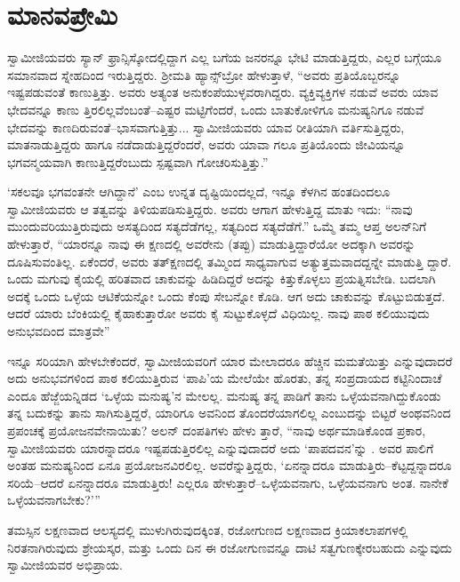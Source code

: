 
\chapter{ಮಾನವಪ್ರೇಮಿ}

\noindent

ಸ್ವಾಮೀಜಿಯವರು ಸ್ಯಾನ್ ಫ್ರಾನ್ಸಿಸ್ಕೋದಲ್ಲಿದ್ದಾಗ ಎಲ್ಲ ಬಗೆಯ ಜನರನ್ನೂ ಭೇಟಿ ಮಾಡುತ್ತಿದ್ದರು, ಎಲ್ಲರ ಬಗ್ಗೆಯೂ ಸಮಾನವಾದ ಸ್ನೇಹದಿಂದ ಇರುತ್ತಿದ್ದರು. ಶ್ರೀಮತಿ ಹ್ಯಾನ್ಸ್​ಬ್ರೋ ಹೇಳುತ್ತಾಳೆ, “ಅವರು ಪ್ರತಿಯೊಬ್ಬರನ್ನೂ ಇಷ್ಟಪಡುವಂತೆ ಕಾಣುತ್ತಿತ್ತು. ಅವರು ಅತ್ಯಂತ ಅನುಕಂಪೆಯುಳ್ಳವರಾಗಿದ್ದರು. ವ್ಯಕ್ತಿವ್ಯಕ್ತಿಗಳ ನಡುವೆ ಅವರು ಯಾವ ಭೇದವನ್ನೂ ಕಾಣು ತ್ತಿರಲಿಲ್ಲವೆಂಬಂತೆ–ಎಷ್ಟರ ಮಟ್ಟಿಗೆಂದರೆ, ಒಂದು ಬಾತುಕೋಳಿಗೂ ಮನುಷ್ಯನಿಗೂ ನಡುವೆ ಭೇದವನ್ನು ಕಾಣದಿರುವಂತೆ–ಭಾಸವಾಗುತ್ತಿತ್ತು... ಸ್ವಾಮೀಜಿಯವರು ಯಾವ ರೀತಿಯಾಗಿ ವರ್ತಿಸುತ್ತಿದ್ದರು, ಮಾತನಾಡುತ್ತಿದ್ದರು ಹಾಗೂ ನಡೆದಾಡುತ್ತಿದ್ದರೆಂದರೆ, ಅವರು ಯಾವಾ ಗಲೂ ಪ್ರತಿಯೊಂದು ಜೀವಿಯನ್ನೂ ಭಗವನ್ಮಯವಾಗಿ ಕಾಣುತ್ತಿದ್ದರೆಂಬುದು ಸ್ಪಷ್ಟವಾಗಿ ಗೋಚರಿಸುತ್ತಿತ್ತು.”

‘ಸಕಲವೂ ಭಗವಂತನೇ ಆಗಿದ್ದಾನೆ’ ಎಂಬ ಉನ್ನತ ದೃಷ್ಟಿಯಿಂದಲ್ಲದೆ, ಇನ್ನೂ ಕೆಳಗಿನ ಹಂತದಿಂದಲೂ ಸ್ವಾಮೀಜಿಯವರು ಆ ತತ್ವವನ್ನು ತಿಳಿಯಪಡಿಸುತ್ತಿದ್ದರು. ಅವರು ಆಗಾಗ ಹೇಳುತ್ತಿದ್ದ ಮಾತು ಇದು: “ನಾವು ಮುಂದುವರಿಯುತ್ತಿರುವುದು ಅಸತ್ಯದಿಂದ ಸತ್ಯದೆಡೆಗಲ್ಲ, ಸತ್ಯದಿಂದ ಸತ್ಯದೆಡೆಗೆ.” ಒಮ್ಮೆ ತಮ್ಮ ಆಪ್ತ ಅಲನ್​ನಿಗೆ ಹೇಳುತ್ತಾರೆ, “ಯಾರನ್ನೂ ನಾವು ಈ ಕ್ಷಣದಲ್ಲಿ ಅವರೇನು (ತಪ್ಪು) ಮಾಡುತ್ತಿದ್ದಾರೆಯೋ ಅದಕ್ಕಾಗಿ ಅವರನ್ನು ದೂಷಿಸುವಂತಿಲ್ಲ. ಏಕೆಂದರೆ, ಅವರು ತತ್​ಕ್ಷಣದಲ್ಲಿ ತಮ್ಮಿಂದ ಸಾಧ್ಯವಾಗುವ ಅತ್ಯುತ್ತಮವಾದದ್ದನ್ನೇ ಮಾಡುತ್ತಿ ದ್ದಾರೆ. ಒಂದು ಮಗುವು ಕೈಯಲ್ಲಿ ಹರಿತವಾದ ಚಾಕುವನ್ನು ಹಿಡಿದಿದ್ದರೆ ಅದನ್ನು ಕಿತ್ತುಕೊಳ್ಳಲು ಪ್ರಯತ್ನಿಸಬೇಡಿ. ಬದಲಾಗಿ ಅದಕ್ಕೆ ಒಂದು ಒಳ್ಳೆಯ ಆಟಿಕೆಯನ್ನೋ ಒಂದು ಕೆಂಪು ಸೇಬನ್ನೋ ಕೊಡಿ. ಆಗ ಅದು ಚಾಕುವನ್ನು ಕೊಟ್ಟುಬಿಡುತ್ತದೆ. ಆದರೆ ಯಾರು ಬೆಂಕಿಯಲ್ಲಿ ಕೈಹಾಕುತ್ತಾರೋ ಅವರು ಕೈ ಸುಟ್ಟುಕೊಳ್ಳದೆ ವಿಧಿಯಿಲ್ಲ. ನಾವು ಪಾಠ ಕಲಿಯುವುದು ಅನುಭವದಿಂದ ಮಾತ್ರವೇ”

ಇನ್ನೂ ಸರಿಯಾಗಿ ಹೇಳಬೇಕೆಂದರೆ, ಸ್ವಾಮೀಜಿಯವರಿಗೆ ಯಾರ ಮೇಲಾದರೂ ಹೆಚ್ಚಿನ ಮಮತೆಯಿತ್ತು ಎನ್ನುವುದಾದರೆ ಅದು ಅನುಭವಗಳಿಂದ ಪಾಠ ಕಲಿಯುತ್ತಿರುವ ‘ಪಾಪಿ’ಯ ಮೇಲೆಯೇ ಹೊರತು, ತನ್ನ ಸಂಪ್ರದಾಯದ ಕಟ್ಟಿನಿಂದಾಚೆ ಎಂದೂ ಹೆಜ್ಜೆಯನ್ನಿಡದ ‘ಒಳ್ಳೆಯ ಮನುಷ್ಯ’ನ ಮೇಲಲ್ಲ. ಮನುಷ್ಯ ತನ್ನ ಪಾಡಿಗೆ ತಾನು ಒಳ್ಳೆಯವನಾಗಿದ್ದುಕೊಂಡು ತನ್ನ ಬದುಕನ್ನು ತಾನು ಸಾಗಿಸುತ್ತಿದ್ದರೆ, ಯಾರಿಗೂ ಅವನಿಂದ ತೊಂದರೆಯಾಗಲಿಲ್ಲ ಎಂಬುದನ್ನು ಬಿಟ್ಟರೆ ಅಂಥವನಿಂದ ಪ್ರಪಂಚಕ್ಕೆ ಪ್ರಯೋಜನವೇನಾಯಿತು? ಅಲನ್ ದಂಪತಿಗಳು ಹೇಳು ತ್ತಾರೆ, “ನಾವು ಅರ್ಥಮಾಡಿಕೊಂಡ ಪ್ರಕಾರ, ಸ್ವಾಮೀಜಿಯವರು ಯಾರನ್ನಾದರೂ ಇಷ್ಟಪಡುತ್ತಿರಲಿಲ್ಲ ಎನ್ನುವುದಾದರೆ ಅದು ‘ಪಾಪದವನ’ನ್ನು . ಅವರ ಪಾಲಿಗೆ ಅಂತಹ ಮನುಷ್ಯನಿಂದ ಏನೂ ಪ್ರಯೋಜನವಿರಲಿಲ್ಲ. ಅವರೆನ್ನುತ್ತಿದ್ದರು, ‘ಏನನ್ನಾದರೂ ಮಾಡುತ್ತಿರು–ಕೆಟ್ಟದ್ದನ್ನಾದರೂ ಸರಿಯೆ–ಆದರೆ ಏನನ್ನಾದರೂ ಮಾಡುತ್ತಿರು! ಎಲ್ಲರೂ ಹೇಳುತ್ತಾರೆ–ಒಳ್ಳೆಯವನಾಗು, ಒಳ್ಳೆಯವನಾಗು ಅಂತ. ನಾನೇಕೆ ಒಳ್ಳೆಯವನಾಗಬೇಕು?’”

ತಮಸ್ಸಿನ ಲಕ್ಷಣವಾದ ಆಲಸ್ಯದಲ್ಲಿ ಮುಳುಗಿರುವುದಕ್ಕಿಂತ, ರಜೋಗುಣದ ಲಕ್ಷಣವಾದ ಕ್ರಿಯಾಕಲಾಪಗಳಲ್ಲಿ ನಿರತನಾಗಿರುವುದು ಶ್ರೇಯಸ್ಕರ, ಮತ್ತು ಒಂದು ದಿನ ಈ ರಜೋಗುಣವನ್ನೂ ದಾಟಿ ಸತ್ವಗುಣಕ್ಕೇರಬಹುದು ಎನ್ನುವುದು ಸ್ವಾಮೀಜಿಯವರ ಅಭಿಪ್ರಾಯ.

